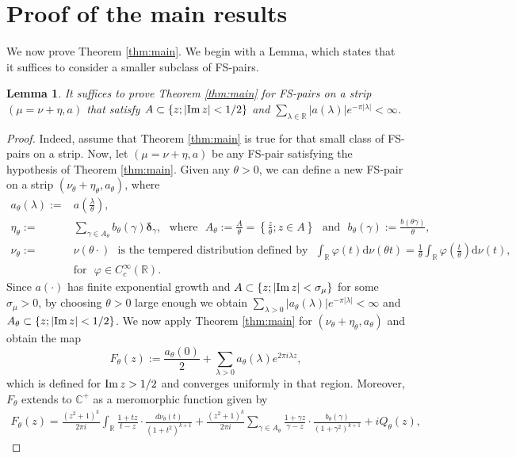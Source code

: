 \documentclass[a4paper,reqno,12pt]{amsart}
\newtheorem{lemma}[theorem]{Lemma}
\renewcommand{\r}{\mathbb{R}}
\newcommand{\cp}{\mathbb{C}} %
\newcommand{\bo}{\boldsymbol}
\newcommand{\la}{\lambda}
\newcommand{\ga}{\gamma}
\newcommand{\si}{\sigma}
\newcommand{\p}{\varphi}
\renewcommand{\d}{\mathrm{d}}
\newcommand{\cd}{\cdot}
\newcommand{\1}{{\bf 1}}
\newcommand{\del}{{\bo \delta}}
\renewcommand{\Im}{{\rm Im}\,}
\begin{document}
\section{Proof of the main results}
\label{section:proof_main_results}
We now prove Theorem \ref{thm:main}. We begin with a Lemma, which states that it suffices to consider a smaller subclass of FS-pairs.
\begin{lemma}
\label{lemma:simple_proof_thm_main}
It suffices to prove Theorem \ref{thm:main} for FS-pairs on a strip $(\mu=\nu+\eta,a)$ that satisfy $A\subset \{z;|\Im{z}|<1/2\}$ and $\sum_{\la\in\r} |a(\la)|e^{-\pi|\la|}<\infty$.
\end{lemma}
\begin{proof}
Indeed, assume that Theorem \ref{thm:main} is true for that small class of FS-pairs on a strip. Now, let $(\mu=\nu+\eta,a)$ be any FS-pair satisfying the hypothesis of Theorem \ref{thm:main}. Given any $\theta>0$, we can define a new FS-pair on a strip $(\nu_\theta+\eta_\theta,a_\theta)$, where
\begin{align*}
    a_\theta(\la):=& a\left(\frac{\la}{\theta}\right),\\
    \eta_\theta:=&\sum_{\ga\in A_\theta} b_\theta(\ga)\del_\ga,\,\, \text{ where }\,\, A_\theta:=\frac{A}{\theta}=\left\{\frac{z}{\theta};z\in A\right\}\,\, \text{ and }\,\, b_\theta(\ga):=\frac{b(\theta\ga)}{\theta},\\
    \nu_\theta:=&\nu(\theta\cd)\,\,\text{ is the tempered distribution defined by }\,\, \int_{\r} \p(t)\d\nu(\theta t)=\frac{1}{\theta}\int_{\r} \p\left(\frac{t}{\theta}\right)\d\nu(t),\\
    &\text{for }\,\, \p\in C^\infty_c(\r). 
\end{align*}
Since $a(\cd)$ has finite exponential growth and $A\subset\{z;|\Im{z}|<\si_\mu\}$ for some $\si_\mu>0$, by choosing $\theta>0$ large enough we obtain $\sum_{\la>0} |a_\theta(\la)|e^{-\pi|\la|}<\infty$ and $A_\theta\subset \{z;|\Im{z}|<1/2\}$. We now apply Theorem \ref{thm:main} for $(\nu_\theta+\eta_\theta,a_\theta)$ and obtain the map
\begin{equation}
\label{eq:def_F_theta}
    F_\theta(z):=\frac{a_\theta(0)}{2}+\sum_{\la>0} a_\theta(\la)e^{2\pi i\la z},
\end{equation}
which is defined for $\Im{z}>1/2$ and converges uniformly in that region. Moreover, $F_\theta$ extends to $\cp^+$ as a meromorphic function given by
\begin{align*}
    F_\theta(z)=\frac{(z^2+1)^k}{2\pi i} \int_{\r} \frac{1+tz}{t-z}\cd\frac{d\nu_\theta(t)}{(1+t^2)^{k+1}}+\frac{(z^2+1)^k}{2\pi i} \sum_{\ga\in A_\theta} \frac{1+\ga z}{\ga-z}\cd\frac{b_\theta(\ga)}{(1+\ga^2)^{k+1}}+iQ_\theta(z),

\end{align*}
\end{proof}
\end{document}
